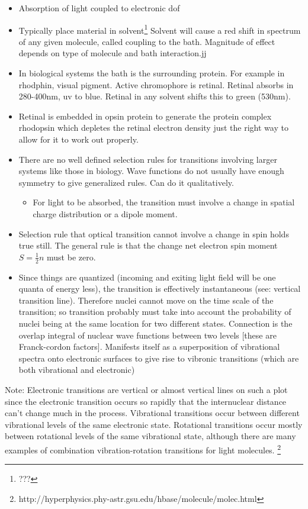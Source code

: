 \documentclass[10pt]{article}
\begin{document}
\begin{itemize}
	\item Absorption of light coupled to electronic dof
	\item Typically place material in solvent\footnote{???}
Solvent will cause a red shift in spectrum of any given molecule, called coupling to the bath. Magnitude of effect depends on type of molecule and bath interaction.jj
\item In biological systems the bath is the surrounding protein. For example in rhodphin, visual pigment. Active chromophore is retinal. Retinal absorbs in 280-400nm, uv to blue. Retinal in any solvent shifts this to green (530nm). 
\item Retinal is embedded in opsin protein to generate the protein complex rhodopsin which depletes the retinal electron density just the right way to allow for it to work out properly.
\item There are no well defined selection rules for transitions involving larger systems like those in biology. Wave functions do not usually have enough symmetry to give generalized rules. Can do it qualitatively. 
	\begin{itemize}
		\item For light to be absorbed, the transition must involve a change in spatial charge distribution or a dipole moment. 
	\end{itemize}
\item Selection rule that optical transition cannot involve a change in spin holds true still. The general rule is that the change net electron spin moment $ S = \frac{1}{2}n $ must be zero.
\item Since things are quantized (incoming and exiting light field will be one quanta of energy less), the transition is effectively instantaneous (see: vertical transition line). Therefore nuclei cannot move on the time scale of the transition; so transition probably must take into account the probability of nuclei being at the same location for two different states. Connection is the overlap integral of nuclear wave functions between two levels [these are Franck-cordon factors]. Manifests itself as a superposition of vibrational spectra onto electronic surfaces to give rise to vibronic transitions (which are both vibrational and electronic)
\end{itemize}

Note: Electronic transitions are vertical or almost vertical lines on such a plot since the electronic transition occurs so rapidly that the internuclear distance can't change much in the process. Vibrational transitions occur between different vibrational levels of the same electronic state. 
Rotational transitions occur mostly between rotational levels of the same vibrational state, although there are many examples of combination vibration-rotation transitions for light molecules. \footnote{http://hyperphysics.phy-astr.gsu.edu/hbase/molecule/molec.html}
\end{document}

